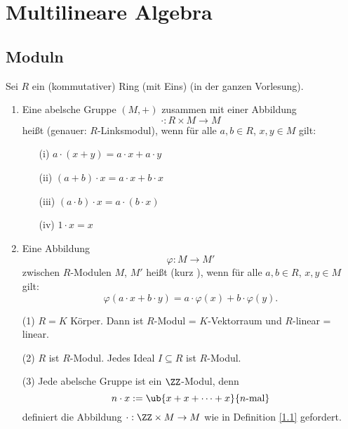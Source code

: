 \chapter{Multilineare Algebra}

\section{Moduln}

Sei $R$ ein (kommutativer) Ring (mit Eins) (in der ganzen Vorlesung).

\begin{Def}
\label{1.1}
\begin{enumerate}
\item Eine abelsche Gruppe $(M,+)$ zusammen mit einer Abbildung
\[
\cdot : R \times M \to M
\]
heißt \emp{\RMod} (genauer:
$R$-Linksmodul), wenn für alle $a,b\in R$, $x,y\in M$ gilt:
\begin{enumerate}
\item[(i)] $a \cdot (x+y) = a \cdot x + a \cdot y$
\item[(ii)] $(a+b) \cdot x = a \cdot x + b \cdot x$
\item[(iii)] $(a \cdot b) \cdot x = a \cdot (b \cdot x)$
\item[(iv)] $1 \cdot x = x$
\end{enumerate}
\item Eine Abbildung 
\[
\varphi: M \to M'
\]
zwischen $R$-Modulen $M$, $M'$
heißt \emp{\RModHom} (kurz
), wenn für alle $a,b \in R$, $x,y \in M$
gilt:
\[
\varphi (a \cdot x + b \cdot y) = a \cdot \varphi (x) + b \cdot \varphi (y).
\]
\end{enumerate}
\end{Def}

\begin{nnBsp}
\begin{enumerate}
\item[(1)] $R = K$ Körper. Dann ist $R$-Modul = $K$-Vektorraum und $R$-linear =
linear.
\item[(2)] $R$ ist $R$-Modul. Jedes Ideal $I \subseteq R$ ist $R$-Modul.
\item[(3)] Jede abelsche Gruppe ist ein $\ZZ$-Modul, denn
\[
n \cdot x := \ub{x + x + \cdots + x}{n\text{-mal}}
\]
definiert die Abbildung $\cdot: \ZZ \times M \to M$ wie in Definition \ref{1.1}
gefordert.
\end{enumerate}
\end{nnBsp}

